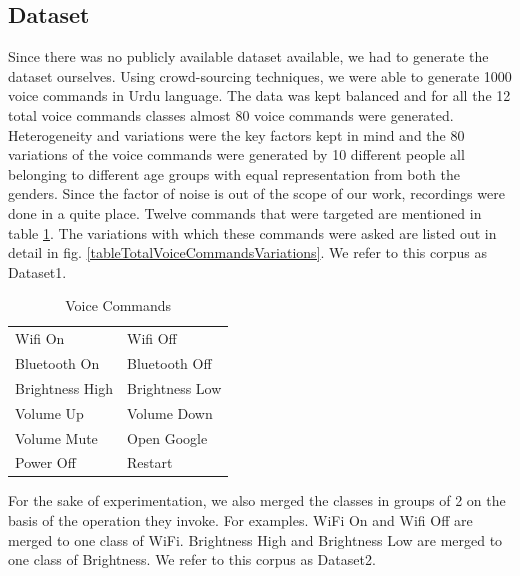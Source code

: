 \documentclass[conference]{IEEEtran}
\begin{document}
\subsection{Dataset}\label{Dataset}
Since there was no publicly available dataset available, we had to generate the dataset ourselves. Using crowd-sourcing techniques, we were able to generate 1000 voice commands in Urdu language. The data was kept balanced and for all the 12 total voice commands classes almost 80 voice commands were generated. Heterogeneity and variations were the key factors kept in mind and the 80 variations of the voice commands were generated by 10 different people all belonging to different age groups with equal representation from both the genders. Since the factor of noise is out of the scope of our work, recordings were done in a quite place. Twelve commands that were targeted are mentioned in table \ref{table:totalVoiceCommands}. The variations with which these commands were asked are listed out in detail in fig. \ref{tableTotalVoiceCommandsVariations}. We refer to this corpus as Dataset1.

\begin{table}[h!]
  \begin{center}
    \caption{Voice Commands}
    \label{table:totalVoiceCommands}
    \begin{tabular}{l|l}
      \hline
			Wifi On & Wifi Off\\
			Bluetooth On & Bluetooth Off\\
			Brightness High & Brightness Low\\
			Volume Up & Volume Down\\
			Volume Mute & Open Google\\
			Power Off & Restart\\
			\hline
    \end{tabular}
  \end{center}
\end{table}

For the sake of experimentation, we also merged the classes in groups of 2 on the basis of the operation they invoke. For examples. WiFi On and Wifi Off are merged to one class of WiFi. Brightness High and Brightness Low are merged to one class of Brightness. We refer to this corpus as Dataset2.
\end{document}
